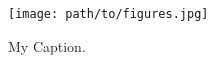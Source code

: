 \begin{figure}[h]
    \center
    \texttt{[image: path/to/figures.jpg]}
    \caption{My Caption.}
    \label{fig:label}
\end{figure}